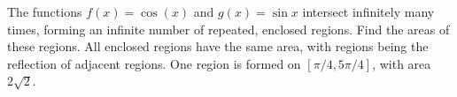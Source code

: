 {The functions $f(x) = \cos (x)$ and $g(x) = \sin x$ intersect infinitely many times, forming an infinite number of repeated, enclosed regions. Find the areas of these regions.\label{1565lastpage}}
{All enclosed regions have the same area, with regions being the reflection of adjacent regions. One region is formed on $[\pi/4,5\pi/4]$, with area  $2\sqrt{2}$.}

